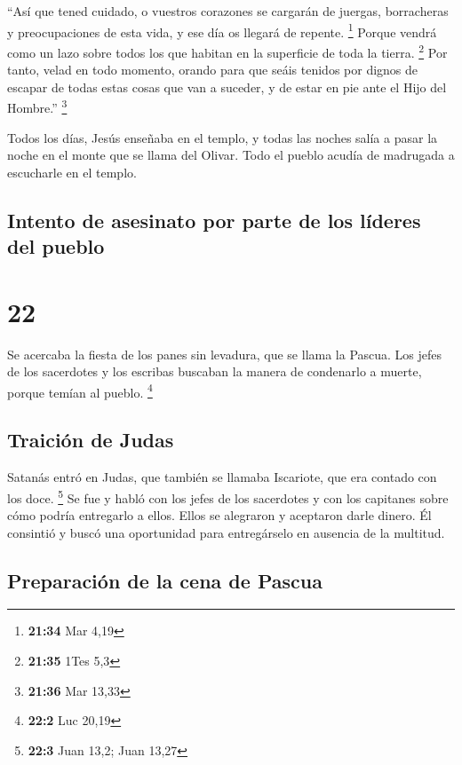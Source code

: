  ``Así que tened cuidado, o vuestros corazones se
cargarán de juergas, borracheras y preocupaciones de esta vida, y ese
día os llegará de repente. \footnote{\textbf{21:34} Mar 4,19}
 Porque vendrá como un lazo sobre todos los que habitan
en la superficie de toda la tierra. \footnote{\textbf{21:35} 1Tes 5,3}
 Por tanto, velad en todo momento, orando para que seáis
tenidos por dignos de escapar de todas estas cosas que van a suceder, y
de estar en pie ante el Hijo del Hombre.'' \footnote{\textbf{21:36} Mar
  13,33}

 Todos los días, Jesús enseñaba en el templo, y todas las
noches salía a pasar la noche en el monte que se llama del Olivar.
 Todo el pueblo acudía de madrugada a escucharle en el
templo.

\hypertarget{intento-de-asesinato-por-parte-de-los-luxedderes-del-pueblo}{%
\subsection{Intento de asesinato por parte de los líderes del
pueblo}\label{intento-de-asesinato-por-parte-de-los-luxedderes-del-pueblo}}

\hypertarget{section-21}{%
\section{22}\label{section-21}}

 Se acercaba la fiesta de los panes sin levadura, que se
llama la Pascua.  Los jefes de los sacerdotes y los
escribas buscaban la manera de condenarlo a muerte, porque temían al
pueblo. \footnote{\textbf{22:2} Luc 20,19}

\hypertarget{traiciuxf3n-de-judas}{%
\subsection{Traición de Judas}\label{traiciuxf3n-de-judas}}

 Satanás entró en Judas, que también se llamaba Iscariote,
que era contado con los doce. \footnote{\textbf{22:3} Juan 13,2; Juan
  13,27}  Se fue y habló con los jefes de los sacerdotes y
con los capitanes sobre cómo podría entregarlo a ellos. 
Ellos se alegraron y aceptaron darle dinero.  Él consintió
y buscó una oportunidad para entregárselo en ausencia de la multitud.

\hypertarget{preparaciuxf3n-de-la-cena-de-pascua}{%
\subsection{Preparación de la cena de
Pascua}\label{preparaciuxf3n-de-la-cena-de-pascua}}

